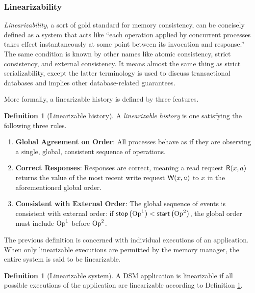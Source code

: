 \documentclass[]             %
{NASA}                       %
\theoremstyle{definition}
\newtheorem{definition}[theorem]{Definition}
\providecommand{\tightlist}{%
  \setlength{\itemsep}{0pt}\setlength{\parskip}{0pt}}
\begin{document}
\subsubsection{Linearizability}
\label{sssec:linearizability}

\emph{Linearizability}, a sort of gold standard for memory
consistency, can be concisely defined as a system that acts like
``each operation applied by concurrent processes takes effect
instantaneously at some point between its invocation and response.''
\cite{10.1145/78969.78972} The same condition is known by other names
like atomic consistency, strict consistency, and external
consistency. It means almost the same thing as strict serializability,
except the latter terminology is used to discuss transactional
databases and implies other database-related guarantees.

More formally, a linearizable history is defined by three features.
\begin{definition}[Linearizable history]
  \label{def:linearizable}
  A \emph{linearizable history} is one satisfying the following three rules.
\begin{enumerate}
  \tightlist
\item \textbf{Global Agreement on Order}: All processes behave as if
  they are observing a single, global, consistent sequence of
  operations.
\item \textbf{Correct Responses}: Responses are correct, meaning a read request
  \(\mathsf{R}\!\left(x, a\right)\) returns the value of the most recent write request
  \(\mathsf{W}\!\left(x, a\right)\) to \(x\) in the aforementioned global order.
\item \textbf{Consistent with External Order}: The global sequence of
  events is consistent with external order: if $\mathsf{stop}\left(\mathrm{Op}^1\right) < \mathsf{start}\left(\mathrm{Op}^2\right)$,
  the global order must include $\mathrm{Op}^1$ before $\mathrm{Op}^2$.
\end{enumerate}
\end{definition}

The previous definition is concerned with individual executions of an
application. When only linearizable executions are permitted by the
memory manager, the entire system is said to be linearizable.

\begin{definition}[Linearizable system]
  A DSM application is linearizable if all possible executions of the
  application are linearizable according to Definition \ref{def:linearizable}.
\end{definition}
\end{document}
